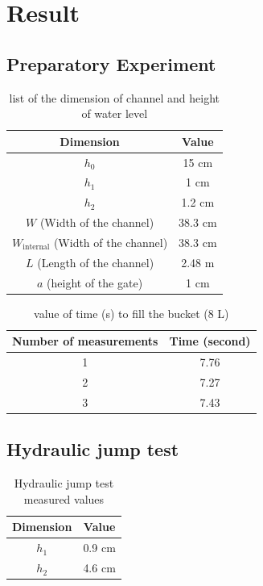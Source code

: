 \documentclass[a4paper]{report}
\begin{document}
\section{Result}
\subsection{Preparatory Experiment}
\begin{table}[H]
    \centering
    \begin{tabular}{|c|c|}\hline
        Dimension & Value \\\hline
        $h_0$ & 15 cm \\\hline
        $h_1$ & 1 cm \\\hline
        $h_2$ & 1.2 cm \\\hline
        $W$ (Width of the channel) & 38.3 cm \\\hline
        $W_\text{internal}$ (Width of the channel) & 38.3 cm \\\hline
        $L$ (Length of the channel) & 2.48 m \\\hline
        $a$ (height of the gate) & 1 cm \\\hline
    \end{tabular}
    \caption{list of the dimension of channel and height of water level}
    \label{tb:prep_list}
\end{table}

\begin{table}[H]
    \centering
    \begin{tabular}{|c|c|}\hline
        Number of measurements & Time (second) \\\hline
        1 & 7.76 \\\hline
        2 & 7.27 \\\hline
        3 & 7.43 \\\hline
    \end{tabular}
    \caption{value of time (s) to fill the bucket (8 L)}
    \label{tb:prep_time}
\end{table}

\subsection{Hydraulic jump test}
\begin{table}[H]
    \centering
    \begin{tabular}{|c|c|}\hline
        Dimension & Value \\\hline
        $h_1$ & 0.9 cm \\\hline
        $h_2$ & 4.6 cm \\\hline
    \end{tabular}
    \caption{Hydraulic jump test measured values}
    \label{tb:jump}
\end{table}
\end{document}
